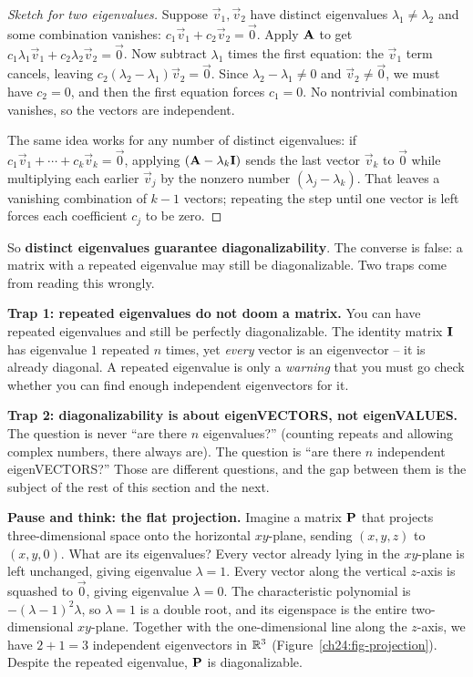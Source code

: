 \begin{proof}[Sketch for two eigenvalues]
Suppose $\vec{v}_1,\vec{v}_2$ have distinct eigenvalues $\lambda_1\neq\lambda_2$
and some combination vanishes: $c_1\vec{v}_1 + c_2\vec{v}_2 = \vec0$. Apply
$\mathbf{A}$ to get $c_1\lambda_1\vec{v}_1 + c_2\lambda_2\vec{v}_2 = \vec0$. Now
subtract $\lambda_1$ times the first equation: the $\vec{v}_1$ term cancels,
leaving $c_2(\lambda_2 - \lambda_1)\vec{v}_2 = \vec0$. Since
$\lambda_2-\lambda_1\neq0$ and $\vec{v}_2\neq\vec0$, we must have $c_2 = 0$, and
then the first equation forces $c_1 = 0$. No nontrivial combination vanishes, so
the vectors are independent.

The same idea works for any number of distinct eigenvalues: if
$c_1\vec{v}_1 + \cdots + c_k\vec{v}_k = \vec0$, applying $(\mathbf{A}-\lambda_k\mathbf{I})$
sends the last vector $\vec{v}_k$ to $\vec{0}$ while multiplying each earlier
$\vec{v}_j$ by the nonzero number $(\lambda_j - \lambda_k)$. That leaves a
vanishing combination of $k-1$ vectors; repeating the step until one vector is
left forces each coefficient $c_j$ to be zero.
\end{proof}

So \textbf{distinct eigenvalues guarantee diagonalizability}. The converse is
false: a matrix with a repeated eigenvalue may still be diagonalizable. Two
traps come from reading this wrongly.

\begin{trapbox}
\textbf{Trap 1: repeated eigenvalues do not doom a matrix.} You can have repeated
eigenvalues and still be perfectly diagonalizable. The identity matrix $\mathbf{I}$
has eigenvalue $1$ repeated $n$ times, yet \emph{every} vector is an eigenvector
-- it is already diagonal. A repeated eigenvalue is only a \emph{warning} that
you must go check whether you can find enough independent eigenvectors for it.

\textbf{Trap 2: diagonalizability is about eigenVECTORS, not eigenVALUES.} The
question is never ``are there $n$ eigenvalues?'' (counting repeats and
allowing complex numbers, there always are). The question is ``are there $n$ independent
eigenVECTORS?'' Those are different questions, and the gap between them is the
subject of the rest of this section and the next.
\end{trapbox}

\begin{intuitionbox}
\textbf{Pause and think: the flat projection.} Imagine a matrix $\mathbf{P}$ that
projects three-dimensional space onto the horizontal $xy$-plane, sending
$(x,y,z)$ to $(x,y,0)$. What are its eigenvalues? Every vector already lying in
the $xy$-plane is left unchanged, giving eigenvalue $\lambda = 1$. Every
vector along the vertical $z$-axis is squashed to $\vec0$, giving eigenvalue
$\lambda = 0$. The characteristic polynomial is $-(\lambda-1)^2\lambda$, so
$\lambda = 1$ is a double root, and its eigenspace is the entire two-dimensional
$xy$-plane. Together with the one-dimensional line along the $z$-axis, we have
$2 + 1 = 3$ independent eigenvectors in $\mathbb{R}^3$
(Figure~\ref{ch24:fig-projection}). Despite the repeated eigenvalue, $\mathbf{P}$
is diagonalizable.
\end{intuitionbox}

